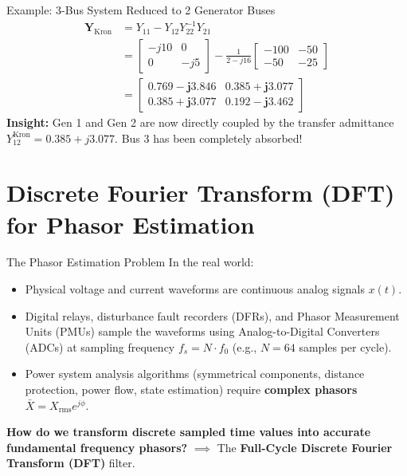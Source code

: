\begin{frame}[allowframebreaks]{Example: 3-Bus System Reduced to 2 Generator Buses}
    \begin{align}
        \mathbf{Y}_{\text{Kron}} &= Y_{11} - Y_{12} Y_{22}^{-1} Y_{21} \\
        &= \begin{bmatrix} -j10 & 0 \\ 0 & -j5 \end{bmatrix} - \frac{1}{2 - j16} \begin{bmatrix} -100 & -50 \\ -50 & -25 \end{bmatrix} \\
        &= \mathbf{\begin{bmatrix} 0.769 - j 3.846 & 0.385 + j 3.077 \\ 0.385 + j 3.077 & 0.192 - j 3.462 \end{bmatrix}}
    \end{align}
    \textbf{Insight:} Gen 1 and Gen 2 are now directly coupled by the transfer admittance $Y_{12}^{\text{Kron}} = 0.385 + j 3.077$. Bus 3 has been completely absorbed!
\end{frame}


\section{Discrete Fourier Transform (DFT) for Phasor Estimation}

\begin{frame}[allowframebreaks]{The Phasor Estimation Problem}
    In the real world:
    \begin{itemize}
        \item Physical voltage and current waveforms are continuous analog signals $x(t)$.
        \item Digital relays, disturbance fault recorders (DFRs), and Phasor Measurement Units (PMUs) sample the waveforms using Analog-to-Digital Converters (ADCs) at sampling frequency $f_s = N \cdot f_0$ (e.g., $N=64$ samples per cycle).
        \item Power system analysis algorithms (symmetrical components, distance protection, power flow, state estimation) require \alert{\textbf{complex phasors}} $\bar{X} = X_{\text{rms}} e^{j\phi}$.
    \end{itemize}

    \textbf{How do we transform discrete sampled time values into accurate fundamental frequency phasors?}
    $\implies$ The \textbf{Full-Cycle Discrete Fourier Transform (DFT)} filter.
\end{frame}

